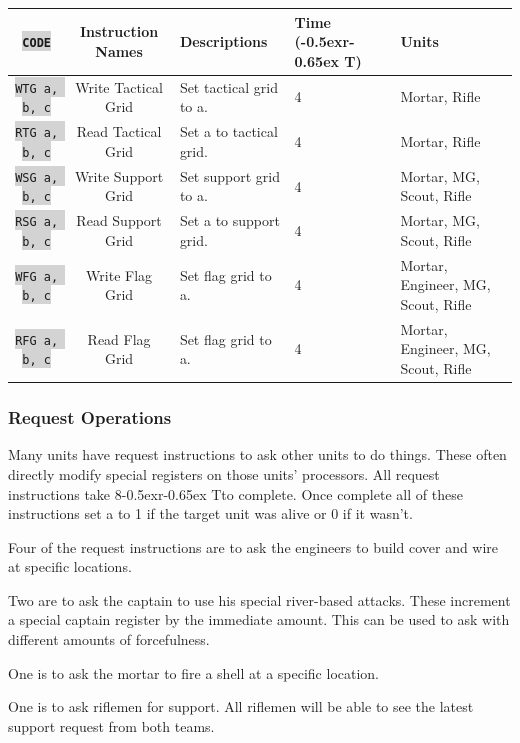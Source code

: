 \documentclass{article}
\newcommand{\vnscode}[1]{\colorbox{lightgray}{\lstinline[language=vns]{#1}}}
\newcommand{\RT}{\lower-0.5ex\hbox{r}\kern-0.65ex T}
\begin{document}
\begin{minipage}{\textwidth}
\label{table:grid}
\centering
\begin{tabular}{|c|c|l|l|l|}
    \hline \vnscode{CODE} & Instruction Names & Descriptions & Time (\RT) & Units \\ \hline
    \vnscode{WTG a, b, c} & Write Tactical Grid & Set tactical grid to a. & 4 & Mortar, Rifle \\ \hline
    \vnscode{RTG a, b, c} & Read Tactical Grid & Set a to tactical grid. & 4 & Mortar, Rifle \\ \hline
    \vnscode{WSG a, b, c} & Write Support Grid & Set support grid to a. & 4 & Mortar, MG, Scout, Rifle \\ \hline
    \vnscode{RSG a, b, c} & Read Support Grid & Set a to support grid. & 4 & Mortar, MG, Scout, Rifle \\ \hline
    \vnscode{WFG a, b, c} & Write Flag Grid & Set flag grid to a. & 4 & Mortar, Engineer, MG, Scout, Rifle \\ \hline
    \vnscode{RFG a, b, c} & Read Flag Grid & Set flag grid to a. & 4 & Mortar, Engineer, MG, Scout, Rifle \\ \hline
\end{tabular}
\end{minipage}

\subsubsection{Request Operations}

Many units have request instructions to ask other units to do things. These
often directly modify special registers on those units' processors. All request
instructions take 8\RT to complete. Once complete all of these instructions set
a to 1 if the target unit was alive or 0 if it wasn't.

Four of the request instructions are to ask the engineers to build cover and
wire at specific locations.

Two are to ask the captain to use his special river-based attacks. These
increment a special captain register by the immediate amount. This can be used
to ask with different amounts of forcefulness.

One is to ask the mortar to fire a shell at a specific location.

One is to ask riflemen for support. All riflemen will be able to see the latest
support request from both teams.
\end{document}
